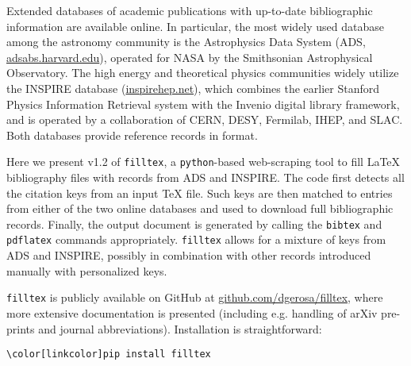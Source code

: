 \documentclass[floats,floatfix,showpacs,amssymb,prd,twocolumn,superscriptaddress,nofootinbib]{revtex4-1}
\newcommand{\filltex}{\texttt{filltex}\xspace}
\newcommand{\latex}{\LaTeX\xspace}
\newcommand{\tex}{\TeX\xspace}
\newcommand{\bibtex}{\hologo{BibTeX}\xspace}
\begin{document}
Extended databases of academic publications with up-to-date bibliographic information are available online. In particular, the most widely used database among the astronomy community is the Astrophysics Data System (ADS, \href{http://adsabs.harvard.edu/}{adsabs.harvard.edu}), operated for NASA by the Smithsonian Astrophysical Observatory. The high energy and theoretical physics communities widely utilize the INSPIRE database (\href{http://inspirehep.net/}{inspirehep.net}), which combines the earlier Stanford Physics Information Retrieval system with the Invenio digital library framework, and is operated by a collaboration of CERN, DESY, Fermilab, IHEP, and SLAC. Both databases provide reference records in \bibtex format.

Here we present v1.2 of \filltex, a \texttt{python}-based web-scraping tool to  fill \latex  bibliography files with records from ADS and INSPIRE. The code  first detects all the citation keys from an input \tex file. Such keys are then matched to entries from either of the two online databases and used to download full bibliographic records. Finally, the output document is generated by calling the \texttt{bibtex} and \texttt{pdflatex} commands appropriately. \filltex allows for a mixture of keys from ADS and INSPIRE, possibly in combination with other records introduced manually with personalized keys.

\filltex is publicly available on GitHub at \href{https://github.com/dgerosa/filltex.git}{github.com/dgerosa/filltex}, where more extensive  documentation is presented (including e.g. handling of  arXiv pre-prints and journal abbreviations). 
Installation is straightforward:
\vspace{-0.1cm}
\begin{Verbatim}[fontsize=\normalsize,commandchars=\\\[\]]
\color[linkcolor]pip install filltex
\end{Verbatim}
\vspace{-0.1cm}
\end{document}
